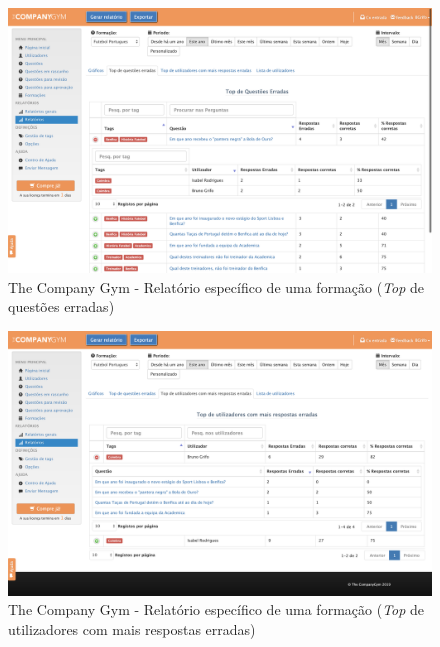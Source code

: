 \begin{figure}[ht!]
	\begin{center}
		\includegraphics[width=1\textwidth]{img/tcg/tcg-data-f1.png}
		\caption{The Company Gym - Relatório específico de uma formação (\textit{Top} de questões erradas)}
		\label{fig:tcg-data-f1}
	\end{center}
\end{figure}
\mbox{}
\begin{figure}[ht!]
	\begin{center}
		\includegraphics[width=1\textwidth]{img/tcg/tcg-data-f2.png}
		\caption{The Company Gym - Relatório específico de uma formação (\textit{Top} de utilizadores com mais respostas erradas)}
		\label{fig:tcg-data-f2}
	\end{center}
\end{figure}

